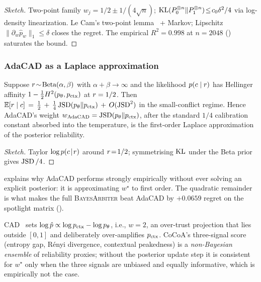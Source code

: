 \begin{proof}[Sketch]
Two-point family $w_j\!=\!1/2\pm 1/(4\sqrt n)$;
$\operatorname{KL}(P_0^{\otimes n}\|P_1^{\otimes n})\!\le\!c_0\delta^2/4$ via
log-density linearization.  Le Cam's two-point
lemma~\citep[Thm.~2.2]{tsybakov2009nonparametric} + Markov;
Lipschitz $\|\partial_w\hat p_w\|_1\!\le\!\delta$ closes the regret.
The empirical $R^2\!=\!0.998$ at $n\!=\!2048$
() saturates the bound.
\end{proof}

\subsubsection{AdaCAD as a Laplace approximation}
\label{app:thm1-adacad}

\begin{lemma}
\label{lem:adacad-laplace}
Suppose $r\!\sim\!\textup{Beta}(\alpha,\beta)$ with $\alpha+\beta\to\infty$
and the likelihood $p(c\mid r)$ has Hellinger affinity
$1-\frac12 H^2(p_\theta,p_{\mathrm{ctx}})$ at $r=1/2$.  Then
$\mathbb{E}[r\mid c]\,=\,\tfrac12\,+\,\tfrac{1}{4}\operatorname{JSD}(p_\theta\|p_{\mathrm{ctx}})\,+\,O(\operatorname{JSD}^2)$
in the small-conflict regime.  Hence AdaCAD's weight
$w_{\textup{AdaCAD}}=\operatorname{JSD}(p_\theta\|p_{\mathrm{ctx}})$, after the standard $1/4$
calibration constant absorbed into the temperature, is the first-order Laplace
approximation of the posterior reliability.
\end{lemma}

\begin{proof}[Sketch]
Taylor $\log p(c\!\mid\!r)$ around $r\!=\!1/2$; symmetrising
$\operatorname{KL}$ under the Beta prior gives $\operatorname{JSD}/4$.
\end{proof}

 explains why AdaCAD performs strongly empirically
without ever solving an explicit posterior: it is approximating $w^\star$ to
first order.  The quadratic remainder is what makes the full \textsc{BayesArbiter}
beat AdaCAD by $+0.0659$ regret on the spotlight matrix
().

\begin{remark}[CAD as $w=2$, CoCoA as ensemble]
CAD~\citep{shi2024cad} sets $\log\hat p\propto\log p_{\mathrm{ctx}}-\log p_\theta$,
i.e., $w=2$, an over-trust projection that lies outside $[0,1]$ and
deliberately over-amplifies $p_{\mathrm{ctx}}$.  CoCoA's three-signal score
(entropy gap, R\'enyi divergence, contextual peakedness) is a
\emph{non-Bayesian ensemble} of reliability proxies; without the posterior
update step it is consistent for $w^\star$ only when the three signals are
unbiased and equally informative, which is empirically not the case.
\end{remark}

